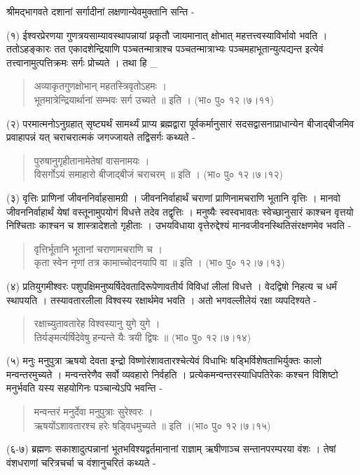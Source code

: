 श्रीमद्भागवते दशानां सर्गादीनां लक्षणान्येवमुक्तानि सन्ति -

(१) ईश्वरप्रेरणया गुणत्रयसाम्यावस्थापन्नायां प्रकृतौ जायमानात् क्षोभात् महत्तत्त्वस्याविर्भावो भवति । ततोऽहङ्कारः तत एकादशेन्द्रियाणि पञ्चतन्मात्राश्च पञ्चतन्मात्राभ्यः पञ्चमहाभूतान्युत्पद्यन्त इत्येवं तत्त्वानामुत्पत्तिक्रमः सर्गः प्रोच्यते । तथा हि _
\begin{verse}
अव्याकृतगुणक्षोभान् महतस्त्रिवृतोऽहमः ।\\
भूतमात्रेन्द्रियार्थानां सम्भवः सर्ग उच्यते ॥ इति । (भा० पु० १२।७।११)
\end{verse}
(२) परमात्मनोऽनुग्रहात् सृष्ट्यर्थं सामर्थ्यं प्राप्य ब्रह्मद्वारा पूर्वकर्मानुसारं सदसद्वासनाप्राधान्येन बीजाद्बीजमिव प्रवाहापन्नं यत् चराचरात्मकं जगज्जायते तद्विसर्गः कथ्यते -
\begin{verse}
पुरुषानुगृहीतानामेतेषां वासनामयः ।\\
विसर्गोऽयं समाहारो बीजाद्बीजं चराचरम् ॥ इति । (भा० पु० १२।७।१२)
\end{verse}
(३) वृत्तिः प्राणिनां जीवननिर्वाहसामग्री । जीवननिर्वाहार्थं चराणां प्राणिनामचराणि भूतानि वृत्तिः । मानवो जीवननिर्वाहार्थं येषां वस्तूनामुपयोगं विधत्ते तदेव तद्वृत्तिः । मनुष्यैः स्वस्वभावतः स्वेच्छानुसारं काश्चन वृत्तयो निश्चिताः काश्चन च शास्त्रादेशतो गृहीताः । उभयविधाया वृत्तेरुद्देश्यं मानवजीवनस्थितिसंरक्षणमेव भवति -
\begin{verse}
वृत्तिर्भूतानि भूतानां चराणामचराणि च ।\\
कृता स्वेन नृणां तत्र कामाच्चोदनयापि वा ॥ इति । (भा० पु० १२।७।१३)
\end{verse}
(४) प्रतियुगमीश्वरः पशुपक्षिमनुष्यर्षिदेवतादिरूपेणावतीर्य विविधां लीलां विधत्ते । वेदद्विषो निहत्य च धर्मं स्थापयति । तस्यावतारलीला विश्वस्य रक्षार्थमेव भवति । अतो भगवल्लीलेयं रक्षा व्यपदिश्यते -
\begin{verse}
रक्षाच्युतावतारेह विश्वस्यानु युगे युगे ।\\
तिर्यङ्मर्त्यर्षिदेवेषु हन्यन्ते यैः त्रयी द्विषः ॥ (भा० पु० १२।७।१४)
\end{verse}
(५) मनुः मनुपुत्रा ऋषयो देवता इन्द्रो विष्णोरंशावतारश्चेत्येवं विधाभिः षड्भिर्विशेषताभिर्युक्तः कालो मन्वन्तरमुच्यते । मन्वन्तरेणैव सर्वो व्यवहारो निर्वहति । प्रत्येकमन्वन्तरस्याधिपतिरेकः कश्चन विशिष्टो मनुर्भवति यस्य सहयोगिनः पञ्चान्येऽपि भवन्ति -
\begin{verse}
मन्वन्तरं मनुर्देवा मनुपुत्राः सुरेश्वरः ।\\
ऋषयोंऽशावतारश्च हरेः षड्विधमुच्यते ॥ इति ।(भा० पु० १२।७।१५)
\end{verse}
(६-७) ब्रह्मणः सकाशादुत्पन्नानां भूतभविश्यद्वर्तमानानां राज्ञाम् ऋषीणाञ्च सन्तानपरम्परया वंशः । तेषां वंशधराणां चरित्रचर्चा च वंशानुचरितं कथ्यते -
